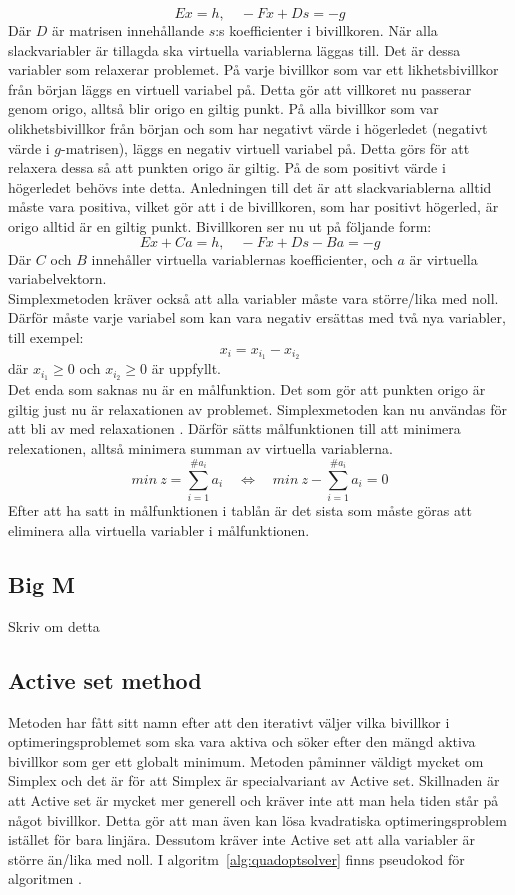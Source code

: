 $$Ex = h, \quad -Fx+Ds = -g$$
Där $D$ är matrisen innehållande $s$:s koefficienter i bivillkoren.
När alla slackvariabler är tillagda ska virtuella variablerna läggas till. Det är dessa variabler som relaxerar problemet. På varje bivillkor som var ett likhetsbivillkor från början läggs en virtuell variabel på. Detta gör att villkoret nu passerar genom origo, alltså blir origo en giltig punkt. På alla bivillkor som var olikhetsbivillkor från början och som har negativt värde i högerledet (negativt värde i $g$-matrisen), läggs en negativ virtuell variabel på. Detta görs för att relaxera dessa så att punkten origo är giltig. På de som positivt värde i högerledet behövs inte detta. Anledningen till det är att slackvariablerna alltid måste vara positiva, vilket gör att i de bivillkoren, som har positivt högerled, är origo alltid är en giltig punkt. Bivillkoren ser nu ut på följande form:
$$Ex+Ca = h, \quad -Fx + Ds - Ba = -g$$
Där $C$ och $B$ innehåller virtuella variablernas koefficienter, och $a$ är virtuella variabelvektorn. \\ 
Simplexmetoden kräver också att alla variabler måste vara större/lika med noll. Därför måste varje variabel som kan vara negativ ersättas med två nya variabler, till exempel:
$$x_i = x_{i_1} - x_{i_2}$$
där $x_{i_1}\geq 0$ och $x_{i_2}\geq 0$ är uppfyllt. \\
Det enda som saknas nu är en målfunktion. Det som gör att punkten origo är giltig just nu är relaxationen av problemet. Simplexmetoden kan nu användas för att bli av med relaxationen . Därför sätts målfunktionen till att minimera relexationen, alltså minimera summan av virtuella variablerna.
$$min \: z = \sum^{\#a_i}_{i=1} {a_i} \quad  \Leftrightarrow \quad min \: z - \sum^{\#a_i}_{i=1} {a_i} = 0$$
Efter att ha satt in målfunktionen i tablån är det sista som måste göras att eliminera alla virtuella variabler i målfunktionen\citep{numericaloptimization}.

\subsection{Big M}
Skriv om detta

\subsection{Active set method}   
Metoden har fått sitt namn efter att den iterativt väljer vilka bivillkor i optimeringsproblemet som ska vara aktiva och söker efter den mängd aktiva bivillkor som ger ett globalt minimum. Metoden påminner väldigt mycket om Simplex och det är för att Simplex är specialvariant av Active set. Skillnaden är att Active set är mycket mer generell och kräver inte att man hela tiden står på något bivillkor. Detta gör att man även kan lösa kvadratiska optimeringsproblem istället för bara linjära. Dessutom kräver inte Active set att alla variabler är större än/lika med noll. I algoritm~\ref{alg:quadoptsolver} finns pseudokod för algoritmen \citep{numericaloptimization}.

